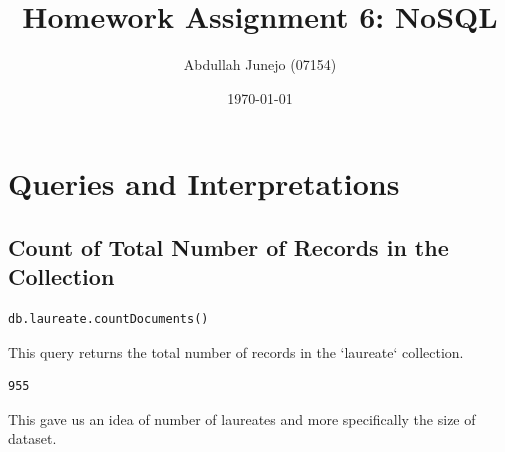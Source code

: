 \documentclass{article}
\begin{document}
\title{Homework Assignment 6: NoSQL}
\author{Abdullah Junejo (07154)}
\date{\today}
\maketitle

\section{Queries and Interpretations}

\subsection{Count of Total Number of Records in the Collection}
\begin{lstlisting}
db.laureate.countDocuments()
\end{lstlisting}
This query returns the total number of records in the `laureate` collection.
\begin{lstlisting}
955
\end{lstlisting}
This gave us an idea of number of laureates and more specifically the size of dataset.
\end{document}
